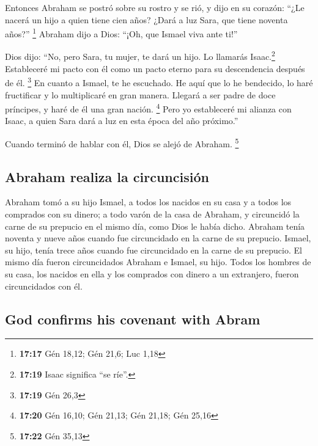 \begin{paracol}{2}
 Entonces Abraham se postró sobre su rostro y se rió, y
dijo en su corazón: ``¿Le nacerá un hijo a quien tiene cien años? ¿Dará
a luz Sara, que tiene noventa años?'' \footnote{\textbf{17:17} Gén
  18,12; Gén 21,6; Luc 1,18}  Abraham dijo a Dios: ``¡Oh,
que Ismael viva ante ti!''

 Dios dijo: ``No, pero Sara, tu mujer, te dará un hijo.
Lo llamarás Isaac.\footnote{\textbf{17:19} Isaac significa ``se ríe''.}
Estableceré mi pacto con él como un pacto eterno para su descendencia
después de él. \footnote{\textbf{17:19} Gén 26,3}  En
cuanto a Ismael, te he escuchado. He aquí que lo he bendecido, lo haré
fructificar y lo multiplicaré en gran manera. Llegará a ser padre de
doce príncipes, y haré de él una gran nación. \footnote{\textbf{17:20}
  Gén 16,10; Gén 21,13; Gén 21,18; Gén 25,16}  Pero yo
estableceré mi alianza con Isaac, a quien Sara dará a luz en esta época
del año próximo.''

 Cuando terminó de hablar con él, Dios se alejó de
Abraham. \footnote{\textbf{17:22} Gén 35,13}

\hypertarget{abraham-realiza-la-circuncisiuxf3n}{%
\subsection{Abraham realiza la
circuncisión}\label{abraham-realiza-la-circuncisiuxf3n}}

 Abraham tomó a su hijo Ismael, a todos los nacidos en su
casa y a todos los comprados con su dinero; a todo varón de la casa de
Abraham, y circuncidó la carne de su prepucio en el mismo día, como Dios
le había dicho.  Abraham tenía noventa y nueve años
cuando fue circuncidado en la carne de su prepucio. 
Ismael, su hijo, tenía trece años cuando fue circuncidado en la carne de
su prepucio.  El mismo día fueron circuncidados Abraham e
Ismael, su hijo.  Todos los hombres de su casa, los
nacidos en ella y los comprados con dinero a un extranjero, fueron
circuncidados con él.

\switchcolumn
\begin{otherlanguage}{english}

\hypertarget{god-confirms-his-covenant-with-abram}{%
\subsection{God confirms his covenant with
Abram}\label{god-confirms-his-covenant-with-abram}}


\end{otherlanguage}
\end{paracol}
